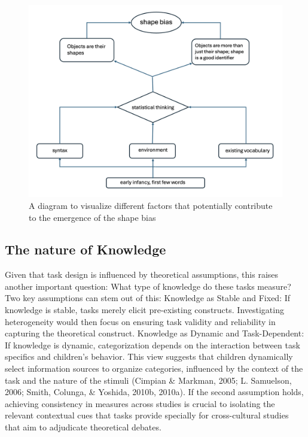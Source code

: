 \documentclass[10pt, letterpaper]{article}
\newenvironment{CodeChunk}{}{}
\begin{document}
\begin{CodeChunk}
\begin{figure}[tb]
\includegraphics[width=1\linewidth]{conceptual_diagram} \caption[A diagram to visualize different factors that potentially contribute to the emergence of the shape bias]{A diagram to visualize different factors that potentially contribute to the emergence of the shape bias}\label{fig:flow_diagram }
\end{figure}
\end{CodeChunk}

\hypertarget{the-nature-of-knowledge}{%
\subsection{The nature of Knowledge}\label{the-nature-of-knowledge}}

Given that task design is influenced by theoretical assumptions, this
raises another important question: What type of knowledge do these tasks
measure? Two key assumptions can stem out of this: Knowledge as Stable
and Fixed: If knowledge is stable, tasks merely elicit pre-existing
constructs. Investigating heterogeneity would then focus on ensuring
task validity and reliability in capturing the theoretical construct.
Knowledge as Dynamic and Task-Dependent: If knowledge is dynamic,
categorization depends on the interaction between task specifics and
children's behavior. This view suggests that children dynamically select
information sources to organize categories, influenced by the context of
the task and the nature of the stimuli (Cimpian \& Markman, 2005; L.
Samuelson, 2006; Smith, Colunga, \& Yoshida, 2010b, 2010a). If the
second assumption holds, achieving consistency in measures across
studies is crucial to isolating the relevant contextual cues that tasks
provide specially for cross-cultural studies that aim to adjudicate
theoretical debates.
\end{document}
